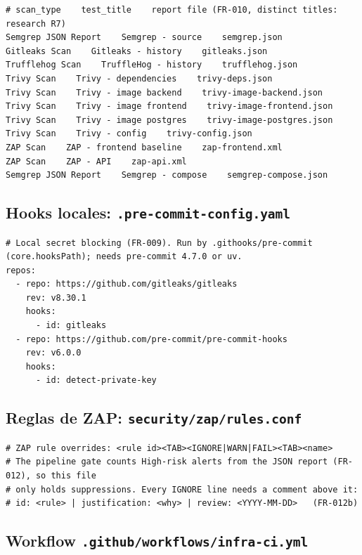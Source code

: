 \begin{lstlisting}
# scan_type    test_title    report file (FR-010, distinct titles: research R7)
Semgrep JSON Report    Semgrep - source    semgrep.json
Gitleaks Scan    Gitleaks - history    gitleaks.json
Trufflehog Scan    TruffleHog - history    trufflehog.json
Trivy Scan    Trivy - dependencies    trivy-deps.json
Trivy Scan    Trivy - image backend    trivy-image-backend.json
Trivy Scan    Trivy - image frontend    trivy-image-frontend.json
Trivy Scan    Trivy - image postgres    trivy-image-postgres.json
Trivy Scan    Trivy - config    trivy-config.json
ZAP Scan    ZAP - frontend baseline    zap-frontend.xml
ZAP Scan    ZAP - API    zap-api.xml
Semgrep JSON Report    Semgrep - compose    semgrep-compose.json
\end{lstlisting}

\subsection{Hooks locales: \texttt{.pre-commit-config.yaml}}
\label{anx:precommit}

\begin{lstlisting}
# Local secret blocking (FR-009). Run by .githooks/pre-commit (core.hooksPath); needs pre-commit 4.7.0 or uv.
repos:
  - repo: https://github.com/gitleaks/gitleaks
    rev: v8.30.1
    hooks:
      - id: gitleaks
  - repo: https://github.com/pre-commit/pre-commit-hooks
    rev: v6.0.0
    hooks:
      - id: detect-private-key
\end{lstlisting}

\subsection{Reglas de ZAP: \texttt{security/zap/rules.conf}}
\label{anx:zap}

\begin{lstlisting}
# ZAP rule overrides: <rule id><TAB><IGNORE|WARN|FAIL><TAB><name>
# The pipeline gate counts High-risk alerts from the JSON report (FR-012), so this file
# only holds suppressions. Every IGNORE line needs a comment above it:
# id: <rule> | justification: <why> | review: <YYYY-MM-DD>   (FR-012b)
\end{lstlisting}

\subsection{Workflow \texttt{.github/workflows/infra-ci.yml}}
\label{anx:infraci}


